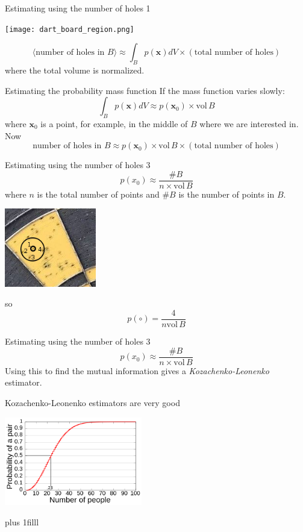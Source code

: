 \documentclass{beamer}
\newcommand{\btVFill}{\vskip0pt plus 1filll}
\begin{document}
\begin{frame}{Estimating using the number of holes 1}
\color{reddish}
\begin{center}
\texttt{[image: dart\_board\_region.png]}
\end{center}
\color{dark}
$$\langle \mbox{number of holes in }B\rangle \approx \int_B p(\mathbf{x})dV \times (\mbox{total number of holes})$$
\color{black}
where the total volume is normalized.
\end{frame}

\begin{frame}{Estimating the probability mass function}
\color{black}
If the mass function varies slowly:
\color{dark}
$$\int_B p(\mathbf{x})dV\approx p(\mathbf{x}_0) \times \mbox{vol}\,B$$
\color{black}
where $\textbf{x}_0$ is a point, for example, in the middle of $B$ where we are interested in. Now
\color{dark}
$$\mbox{number of holes in }B \approx p(\mathbf{x}_0) \times \mbox{vol}\,B \times (\mbox{total number of holes})$$
\color{black}
\end{frame}


\begin{frame}{Estimating using the number of holes 3}
\color{dark}
$$p(x_0)\approx\frac{\#B}{n\times \mbox{vol}\,B}
$$
\color{black}
where $n$ is the total number of points and $\#B$ is the number of points in $B$.
\color{reddish}
\begin{center}
\includegraphics[width=4cm]{dart_board_zoom_ball.png}
\end{center}
\color{dark}
so 
$$p(\circ)=\frac{4}{n\mbox{vol}\,B}$$
\end{frame}


\begin{frame}{Estimating using the number of holes 3}
\color{dark}
$$p(x_0)\approx\frac{\#B}{n\times \mbox{vol}\,B}$$
\color{black}
Using this to find the mutual information gives a \textsl{Kozachenko-Leonenko} estimator.
\end{frame}

\begin{frame}{Kozachenko-Leonenko estimators are very good}
\color{reddish}
\begin{center}
\includegraphics[width=6cm]{Birthday_Paradox.png}
\end{center}
\color{black}
\btVFill
\color{gray}
\color{black}
\end{frame}
\end{document}
